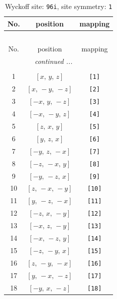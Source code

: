 \documentclass[fleqn,8pt]{jsarticle}
\begin{document}
\renewcommand{\arraystretch}{1.2}
\begin{longtable}{ccc}
\caption{Wyckoff site: {\tt 96i}, site symmetry: {\tt 1}}
 \\
 \hline \hline
No. & position & mapping \\ \hline \endfirsthead

\multicolumn{2}{l}{\tablename\ \thetable{}} \\
 \hline \hline
No. & position & mapping \\ \hline \endhead

 \hline \hline
\multicolumn{2}{r}{\footnotesize\it continued ...} \\ \endfoot

 \hline \hline
\multicolumn{2}{r}{} \\ \endlastfoot

1 & $\left[ x,\, y,\, z \right]$ & {\tt [1]} \\ \hline
2 & $\left[ x,\, - y,\, - z \right]$ & {\tt [2]} \\ \hline
3 & $\left[ - x,\, y,\, - z \right]$ & {\tt [3]} \\ \hline
4 & $\left[ - x,\, - y,\, z \right]$ & {\tt [4]} \\ \hline
5 & $\left[ z,\, x,\, y \right]$ & {\tt [5]} \\ \hline
6 & $\left[ y,\, z,\, x \right]$ & {\tt [6]} \\ \hline
7 & $\left[ - y,\, z,\, - x \right]$ & {\tt [7]} \\ \hline
8 & $\left[ - z,\, - x,\, y \right]$ & {\tt [8]} \\ \hline
9 & $\left[ - y,\, - z,\, x \right]$ & {\tt [9]} \\ \hline
10 & $\left[ z,\, - x,\, - y \right]$ & {\tt [10]} \\ \hline
11 & $\left[ y,\, - z,\, - x \right]$ & {\tt [11]} \\ \hline
12 & $\left[ - z,\, x,\, - y \right]$ & {\tt [12]} \\ \hline
13 & $\left[ - x,\, z,\, - y \right]$ & {\tt [13]} \\ \hline
14 & $\left[ - x,\, - z,\, y \right]$ & {\tt [14]} \\ \hline
15 & $\left[ - z,\, - y,\, x \right]$ & {\tt [15]} \\ \hline
16 & $\left[ z,\, - y,\, - x \right]$ & {\tt [16]} \\ \hline
17 & $\left[ y,\, - x,\, - z \right]$ & {\tt [17]} \\ \hline
18 & $\left[ - y,\, x,\, - z \right]$ & {\tt [18]} \\ \hline

\end{longtable}
\end{document}
